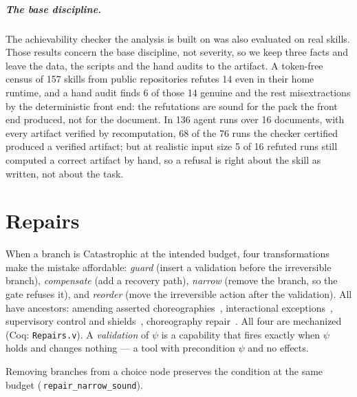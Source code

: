 \documentclass[a4paper,UKenglish,cleveref,autoref,thm-restate,anonymous]{lipics-v2021}
\newcommand{\Cat}{\textsf{Catastrophic}}
\newcommand{\coqok}[1]{\textcolor{okgreen}{\ding{51}}\,\texttt{\small #1}}
\begin{document}
\subparagraph*{The base discipline.} The achievability checker the analysis is
built on was also evaluated on real skills. Those results concern the base
discipline, not severity, so we keep three facts and leave the data, the scripts
and the hand audits to the artifact. A token-free census of 157 skills from
public repositories refutes 14 even in their home runtime, and a hand audit finds
6 of those 14 genuine and the rest misextractions by the deterministic front end:
the refutations are sound for the pack the front end produced, not for the
document. In 136 agent runs over 16 documents, with every artifact verified by
recomputation, 68 of the 76 runs the checker certified produced a verified
artifact; but at realistic input size 5 of 16 refuted runs still computed a
correct artifact by hand, so a refusal is right about the skill as written, not
about the task.

\section{Repairs}\label{sec:repair}

When a branch is \Cat{} at the intended budget, four transformations make the
mistake affordable: \emph{guard} (insert a validation before the irreversible
branch), \emph{compensate} (add a recovery path), \emph{narrow} (remove the
branch, so the gate refuses it), and \emph{reorder} (move the irreversible
action after the validation). All have ancestors: amending asserted
choreographies~\cite{bocchi-lange-tuosto}, interactional
exceptions~\cite{carbone-concur08}, supervisory control and
shields~\cite{ramadge-wonham,bloem-tacas15,alshiekh-aaai18}, choreography
repair~\cite{basu-bultan,lanese-wwv13}. All four are mechanized (Coq:
\texttt{Repairs.v}). A \emph{validation} of $\psi$ is a capability that fires
exactly when $\psi$ holds and changes nothing --- a tool with precondition
$\psi$ and no effects.

\begin{theorem}[Narrow]\label{thm:narrow}
Removing branches from a choice node preserves the condition at the same
budget (\coqok{repair\_narrow\_sound}).
\end{theorem}
\end{document}
